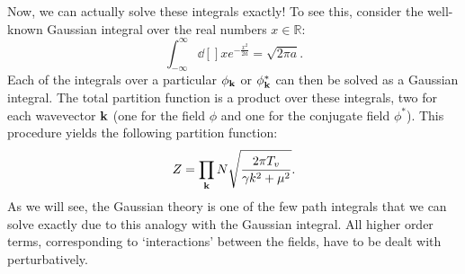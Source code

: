 Now, we can actually solve these integrals exactly! To see this, consider the well-known Gaussian integral over the real numbers $x \in \mathbb{R}$:
\begin{equation}
  \int_{-\infty}^{\infty} \dd[]{x} e^{-\frac{x^2}{2a}} = \sqrt{2\pi a}.
\end{equation}
Each of the integrals over a particular $\phi_{\vb{k}}$ or $\phi^*_{\vb{k}}$ can then be solved as a Gaussian integral. The total partition function is a product over these integrals, two for each wavevector $\vb{k}$ (one for the field $\phi$ and one for the conjugate field $\phi^*$). This procedure yields the following partition function:
\begin{equation}
  Z = \prod_{\vb{k}} N \sqrt{\frac{2\pi T_v}{\gamma k^2 + \mu^2}}.
\end{equation}
As we will see, the Gaussian theory is one of the few path integrals that we can solve exactly due to this analogy with the Gaussian integral.
All higher order terms, corresponding to `interactions' between the fields, have to be dealt with perturbatively.
